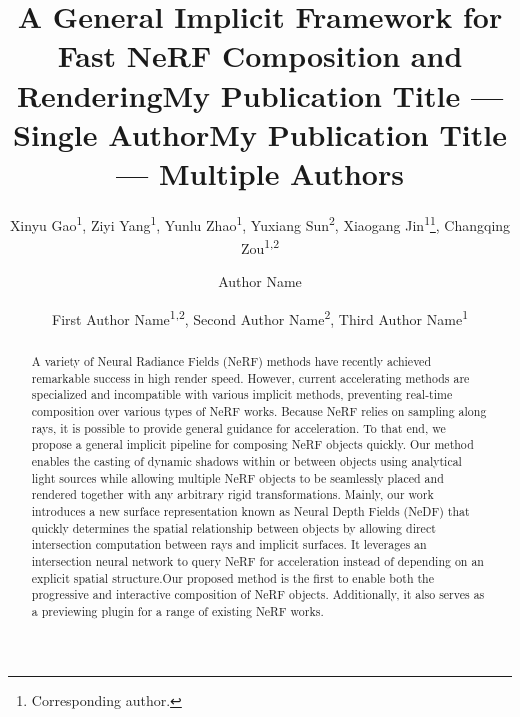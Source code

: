\documentclass[letterpaper]{article}
\title{A General Implicit Framework for Fast NeRF Composition and Rendering}
\author{
    Xinyu Gao\textsuperscript{\rm 1},
    Ziyi Yang\textsuperscript{\rm 1},
    Yunlu Zhao\textsuperscript{\rm 1},
    Yuxiang Sun\textsuperscript{\rm 2},
    Xiaogang Jin\textsuperscript{\rm 1}\thanks{Corresponding author.},
    Changqing Zou\textsuperscript{\rm 1,2}
}
\title{My Publication Title --- Single Author}
\author {
    Author Name
}
\title{My Publication Title --- Multiple Authors}
\author {
    First Author Name\textsuperscript{\rm 1,\rm 2},
    Second Author Name\textsuperscript{\rm 2},
    Third Author Name\textsuperscript{\rm 1}
}
\begin{document}
\maketitle

\begin{abstract}
A variety of Neural Radiance Fields (NeRF) methods have recently achieved remarkable success in high render speed.
However, current accelerating methods are specialized and incompatible with various implicit methods, preventing real-time composition over various types of NeRF works. Because NeRF relies on sampling along rays, it is possible to provide general guidance for acceleration. To that end, we propose a general implicit pipeline for composing NeRF objects quickly.
Our method enables the casting of dynamic shadows within or between objects using analytical light sources while allowing multiple NeRF objects to be seamlessly placed and rendered together with any arbitrary rigid transformations. Mainly, our work introduces a new surface representation known as Neural Depth Fields (NeDF) that quickly determines the spatial relationship between objects by allowing direct intersection computation between rays and implicit surfaces. It leverages an intersection neural network to query NeRF for acceleration instead of depending on an explicit spatial structure.Our proposed method is the first to enable both the progressive and interactive composition of NeRF objects. Additionally, it also serves as a previewing plugin for a range of existing NeRF works.
\end{abstract}
\end{document}
